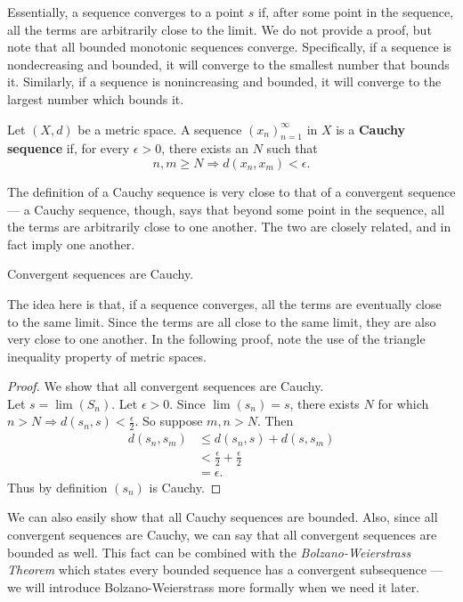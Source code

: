 Essentially, a sequence converges to a point $s$ if, after some point in the sequence, all the terms are arbitrarily close to the limit.  We do not provide a proof, but note that all bounded monotonic sequences converge.  Specifically, if a sequence is nondecreasing and bounded, it will converge to the smallest number that bounds it.  Similarly, if a sequence is nonincreasing and bounded, it will converge to the largest number which bounds it.

\begin{defn}
Let $(X,d)$ be a metric space.  A sequence $(x_n)_{n=1}^\infty$ in $X$ is a \textbf{Cauchy sequence} if, for every $\epsilon > 0$, there exists an $N$ such that
\[n,m \geq N \Rightarrow d(x_n, x_m) < \epsilon.\]
\end{defn}

The definition of a Cauchy sequence is very close to that of a convergent sequence --- a Cauchy sequence, though, says that beyond some point in the sequence, all the terms are arbitrarily close to one another.  The two are closely related, and in fact imply one another.

\begin{theorem}
Convergent sequences are Cauchy.
\end{theorem}

The idea here is that, if a sequence converges, all the terms are eventually close to the same limit.  Since the terms are all close to the same limit, they are also very close to one another.  In the following proof, note the use of the triangle inequality property of metric spaces.

\begin{proof}
We show that all convergent sequences are Cauchy.\\
Let $s = \lim(S_n)$.  Let $\epsilon > 0$.  Since $\lim(s_n) = s$, there exists $N$ for which $n > N \Rightarrow d(s_n, s) < \frac{\epsilon}{2}$.  So suppose $m,n > N$.  Then \begin{align*}
d(s_n, s_m) &\leq d(s_n, s) + d(s, s_m)\\
&< \frac{\epsilon}{2} + \frac{\epsilon}{2}\\
&= \epsilon.
\end{align*}
Thus by definition $(s_n)$ is Cauchy.
\end{proof}

We can also easily show that all Cauchy sequences are bounded.  Also, since all convergent sequences are Cauchy, we can say that all convergent sequences are bounded as well.  This fact can be combined with the \textit{Bolzano-Weierstrass Theorem} which states every bounded sequence has a convergent subsequence --- we will introduce Bolzano-Weierstrass more formally when we need it later.

